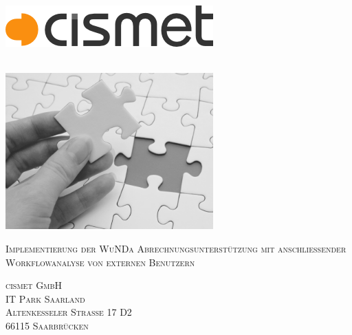 \begin{titlepage}
\AddToShipoutPicture*{\BackgroundPic}
\hfill
\begin{minipage}[t]{0.5\textwidth}
	\begin{flushright}
	\includegraphics[width=\textwidth]{preamble/img/logo_cismet_grey}
	\end{flushright}
\end{minipage}
~\\[1cm]
\includegraphics[width=0.6\textwidth]{preamble/img/puzzleGrey}
~\\[1cm]

\begin{flushright}
\textsc{\Large Implementierung der WuNDa Abrechnungsunterstützung mit anschließender Workflowanalyse von externen Benutzern}

\vfill

\textsc{cismet GmbH}
\\[0.5cm]
\textsc{IT Park Saarland}\\
\textsc{Altenkesseler Straße 17 D2}\\
\textsc{66115 Saarbrücken}\\
\end{flushright}


\end{titlepage}
\restoregeometry

